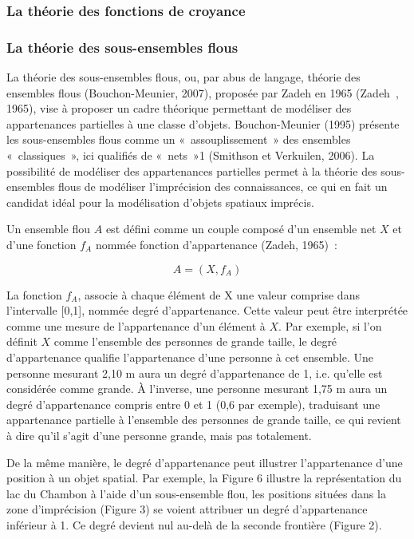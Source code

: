 \subsubsection{La théorie des fonctions de croyance}


\subsubsection{La théorie des sous-ensembles flous}

La théorie des sous-ensembles flous, ou, par abus de langage, théorie
des ensembles flous (Bouchon-Meunier, 2007), proposée par Zadeh en
1965 (Zadeh , 1965), vise à proposer un cadre théorique permettant de
modéliser des appartenances partielles à une classe
d’objets. Bouchon-Meunier (1995) présente les sous-ensembles flous
comme un « assouplissement » des ensembles « classiques », ici
qualifiés de « nets »1 (Smithson et Verkuilen, 2006). La possibilité
de modéliser des appartenances partielles permet à la théorie des
sous-ensembles flous de modéliser l’imprécision des connaissances, ce
qui en fait un candidat idéal pour la modélisation d’objets spatiaux
imprécis.

Un ensemble flou $A$ est défini comme un couple composé d’un ensemble
net $X$ et d’une fonction $f_A$ nommée fonction d’appartenance (Zadeh,
1965) :

\begin{equation}
  A = (X, f_A)  
\end{equation}

La fonction $f_A$, associe à chaque élément de X une valeur comprise
dans l’intervalle [0,1], nommée degré d’appartenance. Cette valeur
peut être interprétée comme une mesure de l’appartenance d’un élément
à $X$. Par exemple, si l’on définit $X$ comme l’ensemble des personnes
de grande taille, le degré d’appartenance qualifie l’appartenance
d’une personne à cet ensemble. Une personne mesurant 2,10 m aura un
degré d’appartenance de 1, i.e. qu’elle est considérée comme grande. À
l’inverse, une personne mesurant 1,75 m aura un degré d’appartenance
compris entre 0 et 1 (0,6 par exemple), traduisant une appartenance
partielle à l’ensemble des personnes de grande taille, ce qui revient
à dire qu’il s’agit d’une personne grande, mais pas totalement.

De la même manière, le degré d’appartenance peut illustrer
l’appartenance d’une position à un objet spatial. Par exemple, la
Figure 6 illustre la représentation du lac du Chambon à l’aide d’un
sous-ensemble flou, les positions situées dans la zone d’imprécision
(Figure 3) se voient attribuer un degré d’appartenance inférieur à
1. Ce degré devient nul au-delà de la seconde frontière (Figure 2).

